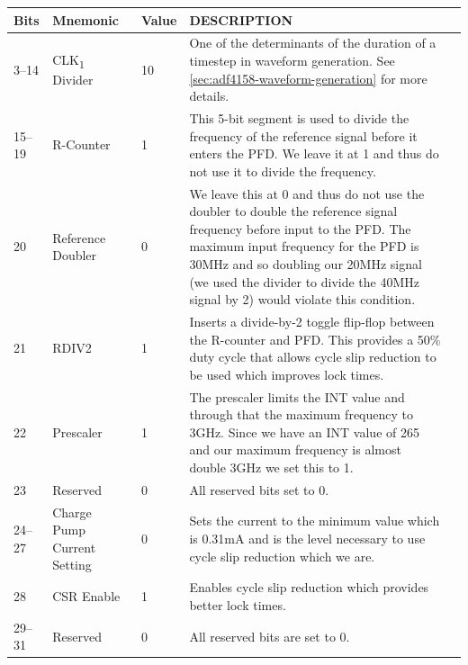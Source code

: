\label{tab:adf4158-reg-map-2}
\begin{tabularx}{\textwidth}{l l l X>{\raggedright\arraybackslash}X}
  \caption{R-DIVIDER REGISTER(R2) MAP} \\
  \toprule
  \textbf{Bits} & \textbf{Mnemonic} & \textbf{Value} & \textbf{DESCRIPTION} \\
  \midrule

  \endhead

  3--14 & CLK\textsubscript{1} Divider & 10 & One of the determinants of the duration of a timestep in
                                              waveform generation. See
                                              \cref{sec:adf4158-waveform-generation} for more
                                              details. \\
  15--19 & R-Counter & 1 & This 5-bit segment is used to divide the frequency of the reference signal
                           before it enters the PFD. We leave it at 1 and thus do not use it to
                           divide the frequency. \\
  20 & Reference Doubler & 0 & We leave this at 0 and thus do not use the doubler to double the
                               reference signal frequency before input to the PFD. The maximum input
                               frequency for the PFD is 30MHz and so doubling our 20MHz signal (we
                               used the divider to divide the 40MHz signal by 2) would violate this
                               condition. \\
  21 & RDIV2 & 1 & Inserts a divide-by-2 toggle flip-flop between the R-counter and PFD. This
                   provides a 50\% duty cycle that allows cycle slip reduction to be used which
                   improves lock times. \\
  22 & Prescaler & 1 & The prescaler limits the INT value and through that the maximum frequency to
                       3GHz. Since we have an INT value of 265 and our maximum frequency is almost
                       double 3GHz we set this to 1. \\
  23 & Reserved & 0 & All reserved bits set to 0. \\
  24--27 & Charge Pump Current Setting & 0 & Sets the current to the minimum value which is 0.31mA
                                             and is the level necessary to use cycle slip reduction
                                             which we are. \\
  28 & CSR Enable & 1 & Enables cycle slip reduction which provides better lock times. \\
  29--31 & Reserved & 0 & All reserved bits are set to 0. \\

  \bottomrule
\end{tabularx}

